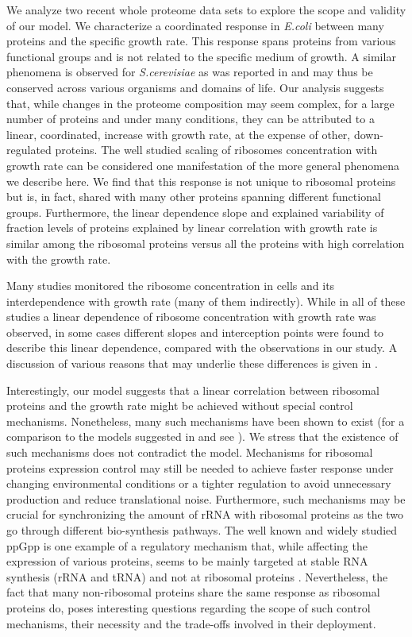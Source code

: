 \documentclass[10pt,letterpaper]{article}
\begin{document}
We analyze two recent whole proteome data sets to explore the scope and validity of our model.
We characterize a coordinated response in \emph{E.coli} between many proteins and the specific growth rate.
This response spans proteins from various functional groups and is not related to the specific medium of growth.
A similar phenomena is observed for \emph{S.cerevisiae} as was reported in \cite{Keren2013} and may thus be conserved across various organisms and domains of life.
Our analysis suggests that, while changes in the proteome composition may seem complex, for a large number of proteins and under many conditions, they can be attributed to a linear, coordinated, increase with growth rate, at the expense of other, down-regulated proteins.
The well studied scaling of ribosomes concentration with growth rate can be considered one manifestation of the more general phenomena we describe here.
We find that this response is not unique to ribosomal proteins but is, in fact, shared with many other proteins spanning different functional groups.
Furthermore, the linear dependence slope and explained variability of fraction levels of proteins explained by linear correlation with growth rate is similar among the ribosomal proteins versus all the proteins with high correlation with the growth rate.

Many studies monitored the ribosome concentration in cells and its interdependence with growth rate \cite{Schaechter1958,Bremer1987,Zaslaver2009,Scott2010,Valgepea2013,Peebo_2015,Hui_2015}(many of them indirectly).
While in all of these studies a linear dependence of ribosome concentration with growth rate was observed, in some cases different slopes and interception points were found to describe this linear dependence, compared with the observations in our study.
A discussion of various reasons that may underlie these differences is given in .

Interestingly, our model suggests that a linear correlation between ribosomal proteins and the growth rate might be achieved without special control mechanisms.
Nonetheless, many such mechanisms have been shown to exist \cite{Nomura1984,Scott2014} (for a comparison to the models suggested in \cite{Scott2010,Scott2011,Scott2014} and \cite{Hui_2015}  see ).
We stress that the existence of such mechanisms does not contradict the model.
Mechanisms for ribosomal proteins expression control may still be needed to achieve faster response under changing environmental conditions or a tighter regulation to avoid unnecessary production and reduce translational noise.
Furthermore, such mechanisms may be crucial for synchronizing the amount of rRNA with ribosomal proteins as the two go through different bio-synthesis pathways.
The well known and widely studied ppGpp is one example of a regulatory mechanism that, while affecting the expression of various proteins, seems to be mainly targeted at stable RNA synthesis (rRNA and tRNA) and not at ribosomal proteins \cite{Srivatsan2008}.
Nevertheless, the fact that many non-ribosomal proteins share the same response as ribosomal proteins do, poses interesting questions regarding the scope of such control mechanisms, their necessity and the trade-offs involved in their deployment.
\end{document}
